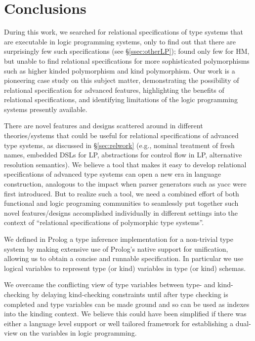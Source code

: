 \documentclass[runningheads,a4paper]{llncs}
\begin{document}
\section{Conclusions}\label{sec:concl}
During this work, we searched for relational specifications of type systems
that are executable in logic programming systems, only to find out that there
are surprisingly few such specifications (see \S\ref{ssec:otherLP}); found only
few for HM, but unable to find relational specifications for more sophisticated
polymorphisms such as higher kinded polymorphism and kind polymorphism.
Our work is a pioneering case study on this subject matter, demonstrating
the possibility of relational specification for advanced features,
highlighting the benefits of relational specifications, and identifying
limitations of the logic programming systems presently available.

There are novel features and designs scattered around in different
theories/systems that could be useful for relational specifications of
advanced type systems, as discussed in \S\ref{sec:relwork} (e.g.,
nominal treatment of fresh names, embedded DSLs for LP, abstractions
for control flow in LP, alternative resolution semantics). We believe
a tool that makes it easy to develop relational specifications of
advanced type systems can open a new era in language construction,
analogous to the impact when parser generators such as yacc were
first introduced. But to realize such a tool, we need a combined effort
of both functional and logic programing communities to seamlessly put
together such novel features/designs accomplished individually
in different settings into the context of ``relational specifications
of polymorphic type systems''.

We defined in Prolog a type inference implementation for a non-trivial
type system by making extensive use of Prolog's native support for
unification, allowing us to obtain a concise and runnable specification.
In particular we use logical variables to represent type (or kind) variables
in type (or kind) schemas.

We overcame the conflicting view of type variables between type- and
kind-checking by delaying kind-checking constraints until after
type checking is completed and type variables can be made ground and so
can be used as indexes into the kinding context. We believe this could
have been simplified if there was either a language level support or
well tailored framework for establishing a dual-view on the variables
in logic programming.
\end{document}
